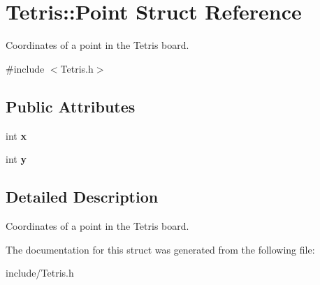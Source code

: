 \hypertarget{structTetris_1_1Point}{}\section{Tetris\+:\+:Point Struct Reference}
\label{structTetris_1_1Point}


Coordinates of a point in the Tetris board.  




{\ttfamily \#include $<$Tetris.\+h$>$}

\subsection*{Public Attributes}
\begin{DoxyCompactItemize}
\item 
\mbox{\label{structTetris_1_1Point_a40228f1e8e154137cb3c0d1868a8efbd}} 
int {\bfseries x}
\item 
\mbox{\label{structTetris_1_1Point_ac6d1d2b776404d20ab41d09456422492}} 
int {\bfseries y}
\end{DoxyCompactItemize}


\subsection{Detailed Description}
Coordinates of a point in the Tetris board. 

The documentation for this struct was generated from the following file\+:\begin{DoxyCompactItemize}
\item 
include/Tetris.\+h\end{DoxyCompactItemize}
